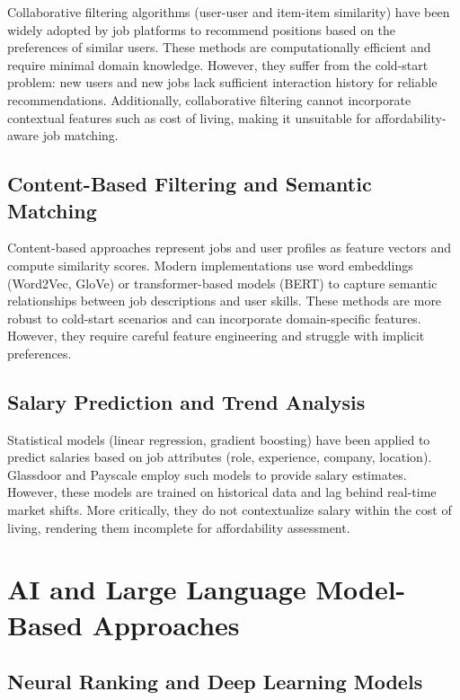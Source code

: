 Collaborative filtering algorithms (user-user and item-item similarity) have been widely adopted by job platforms to recommend positions based on the preferences of similar users. These methods are computationally efficient and require minimal domain knowledge. However, they suffer from the cold-start problem: new users and new jobs lack sufficient interaction history for reliable recommendations. Additionally, collaborative filtering cannot incorporate contextual features such as cost of living, making it unsuitable for affordability-aware job matching.

\subsection{Content-Based Filtering and Semantic Matching}

Content-based approaches represent jobs and user profiles as feature vectors and compute similarity scores. Modern implementations use word embeddings (Word2Vec, GloVe) or transformer-based models (BERT) to capture semantic relationships between job descriptions and user skills. These methods are more robust to cold-start scenarios and can incorporate domain-specific features. However, they require careful feature engineering and struggle with implicit preferences.

\subsection{Salary Prediction and Trend Analysis}

Statistical models (linear regression, gradient boosting) have been applied to predict salaries based on job attributes (role, experience, company, location). Glassdoor and Payscale employ such models to provide salary estimates. However, these models are trained on historical data and lag behind real-time market shifts. More critically, they do not contextualize salary within the cost of living, rendering them incomplete for affordability assessment.

\section{AI and Large Language Model-Based Approaches}

\subsection{Neural Ranking and Deep Learning Models}

